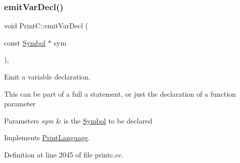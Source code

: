 \subsubsection{\texorpdfstring{emitVarDecl()}{emitVarDecl()}}
{\footnotesize\ttfamily void Print\+C\+::emit\+Var\+Decl (\begin{DoxyParamCaption}\item[{const \mbox{\hyperlink{class_symbol}{Symbol}} $\ast$}]{sym }\end{DoxyParamCaption})\hspace{0.3cm}{\ttfamily [protected]}, {\ttfamily [virtual]}}



Emit a variable declaration. 

This can be part of a full a statement, or just the declaration of a function parameter 
\begin{DoxyParams}{Parameters}
{\em sym} & is the \mbox{\hyperlink{class_symbol}{Symbol}} to be declared \\
\hline
\end{DoxyParams}


Implements \mbox{\hyperlink{class_print_language_a2007b92c662e0261310d2bbac3bfe4f1}{Print\+Language}}.



Definition at line 2045 of file printc.\+cc.

